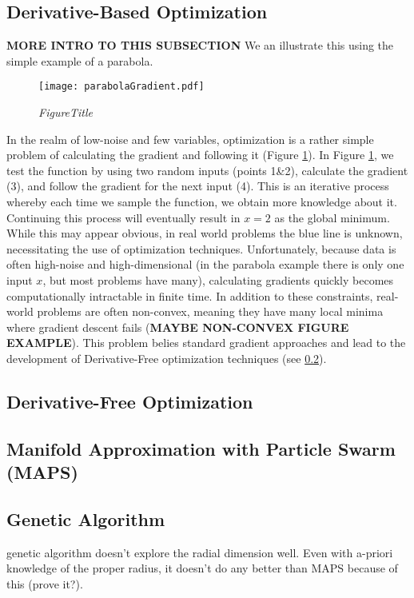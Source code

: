 \subsection{Derivative-Based Optimization}
\label{sec:DerivB}
\textbf{MORE INTRO TO THIS SUBSECTION}
We an illustrate this using the simple example of a parabola. 
\begin{figure}
	\centering
	\texttt{[image: parabolaGradient.pdf]}
	\caption{\textit{FigureTitle}}
	\label{fig:parabolaGradient}
\end{figure}
In the realm of low-noise and few variables, optimization is a rather simple problem of calculating the gradient and following it (Figure \ref{fig:parabolaGradient}). In Figure \ref{fig:parabolaGradient}, we test the function by using two random inputs (points 1\&2), calculate the gradient (3), and follow the gradient for the next input (4). This is an iterative process whereby each time we sample the function, we obtain more knowledge about it. Continuing this process will eventually result in $x=2$ as the global minimum. While this may appear obvious, in real world problems the blue line is unknown, necessitating the use of optimization techniques.
Unfortunately, because data is often high-noise and high-dimensional (in the parabola example there is only one input $x$, but most problems have many), calculating gradients quickly becomes computationally intractable in finite time. In addition to these constraints, real-world problems are often non-convex, meaning they have many local minima where gradient descent fails (\textbf{MAYBE NON-CONVEX FIGURE EXAMPLE}). This problem belies standard gradient approaches and lead to the development of Derivative-Free optimization techniques (see \ref{sec:DerivF}).

\subsection{Derivative-Free Optimization}
\label{sec:DerivF}
\subsection{Manifold Approximation with Particle Swarm (MAPS)}
\subsection{Genetic Algorithm}
genetic algorithm doesn't explore the radial dimension well. Even with a-priori knowledge of the proper radius, it doesn't do any better than MAPS because of this (prove it?).
